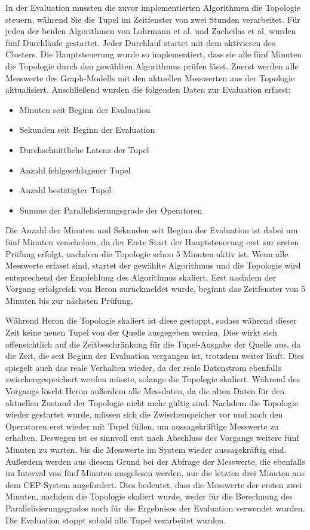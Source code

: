 In der Evaluation mussten die zuvor implementierten Algorithmen die Topologie steuern, während Sie die Tupel im Zeitfenster von zwei Stunden verarbeitet.
Für jeden der beiden Algorithmen von Lohrmann et al. und Zacheilas et al. wurden fünf Durchläufe gestartet.
Jeder Durchlauf startet mit dem aktivieren des Clusters.
Die Hauptsteuerung wurde so implementiert, dass sie alle fünf Minuten die Topologie durch den gewählten Algorithmus prüfen lässt.
Zuerst werden alle Messwerte des Graph-Modells mit den aktuellen Messwerten aus der Topologie aktualisiert.
Anschließend wurden die folgenden Daten zur Evaluation erfasst:
\begin{itemize}
\item{Minuten seit Beginn der Evaluation}
\item{Sekunden seit Beginn der Evaluation}
\item{Durchschnittliche Latenz der Tupel}
\item{Anzahl fehlgeschlagener Tupel}
\item{Anzahl bestätigter Tupel}
\item{Summe der Parallelisierungsgrade der Operatoren}
\end{itemize}
Die Anzahl der Minuten und Sekunden seit Beginn der Evaluation ist dabei um fünf Minuten verschoben, da der Erste Start der Hauptsteuerung erst zur ersten Prüfung erfolgt, nachdem die Topologie schon 5 Minuten aktiv ist.
Wenn alle Messwerte erfasst sind, startet der gewählte Algorithmus und die Topologie wird entsprechend der Empfehlung des Algorithmus skaliert.
Erst nachdem der Vorgang erfolgreich von Heron zurückmeldet wurde, beginnt das Zeitfenster von 5 Minuten bis zur nächsten Prüfung.

Während Heron die Topologie skaliert ist diese gestoppt, sodass während dieser Zeit keine neuen Tupel von der Quelle ausgegeben werden.
Dies wirkt sich offensichtlich auf die Zeitbeschränkung für die Tupel-Ausgabe der Quelle aus, da die Zeit, die seit Beginn der Evaluation vergangen ist, trotzdem weiter läuft.
Dies spiegelt auch das reale Verhalten wieder, da der reale Datenstrom ebenfalls zwischengespeichert werden müsste, solange die Topologie skaliert.
Während des Vorgangs löscht Heron außerdem alle Messdaten, da die alten Daten für den aktuellen Zustand der Topologie nicht mehr gültig sind.
Nachdem die Topologie wieder gestartet wurde, müssen sich die Zwischenspeicher vor und nach den Operatoren erst wieder mit Tupel füllen, um aussagekräftige Messwerte zu erhalten.
Deswegen ist es sinnvoll erst nach Abschluss des Vorgangs weitere fünf Minuten zu warten, bis die Messwerte im System wieder aussagekräftig sind.
Außerdem werden aus diesem Grund bei der Abfrage der Messwerte, die ebenfalls im Interval von fünf Minuten ausgelesen werden, nur die letzten drei Minuten aus dem CEP-System angefordert.
Dies bedeutet, dass die Messwerte der ersten zwei Minuten, nachdem die Topologie skaliert wurde, weder für die Berechnung des Parallelisierungsgrades noch für die Ergebnisse der Evaluation verwendet wurden.
Die Evaluation stoppt sobald alle Tupel verarbeitet wurden.

